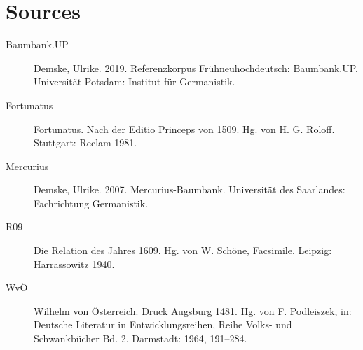 \documentclass[output=paper,colorlinks,citecolor=brown]{langscibook}
\begin{document}
\section*{Sources}


\begin{description}
\item[Baumbank.UP] Demske, Ulrike. 2019. Referenzkorpus Frühneuhochdeutsch: Baumbank.UP. Universität Potsdam: Institut für Germanistik.
\item[Fortunatus] Fortunatus. Nach der Editio Princeps von 1509. Hg. von H. G. Roloff. Stuttgart: Reclam 1981.
\item[Mercurius] Demske, Ulrike. 2007. Mercurius-Baumbank. Universität des Saarlandes: Fachrichtung Germanistik.
\item[R09] Die Relation des Jahres 1609. Hg. von W. Schöne, Facsimile. Leipzig: Harrassowitz 1940.
\item[WvÖ] Wilhelm von Österreich. Druck Augsburg 1481. Hg. von F. Podleiszek, in: Deutsche Literatur in Entwicklungsreihen, Reihe Volks- und Schwankbücher Bd. 2. Darmstadt: 1964, 191--284.
\end{description}

{\sloppy
\printbibliography[heading=subbibliography,notkeyword=this]
}
\end{document}
